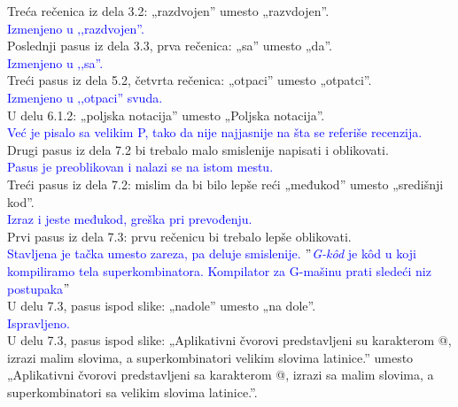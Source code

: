 \documentclass[a4paper]{report}
\newcommand{\odgovor}[1]{\textcolor{blue}{#1}}
\begin{document}
Treća rečenica iz dela 3.2: „razdvojen” umesto „razvdojen”.\\

\odgovor{Izmenjeno u ‚‚razdvojen''.}\\

Poslednji pasus iz dela 3.3, prva rečenica: „sa” umesto „da”.\\

\odgovor{Izmenjeno u ‚‚sa''.}\\

Treći pasus iz dela 5.2, četvrta rečenica: „otpaci” umesto „otpatci”.\\

\odgovor{Izmenjeno u ‚‚otpaci'' svuda.}\\

U delu 6.1.2: „poljska notacija” umesto „Poljska notacija”.\\

\odgovor{Već je pisalo sa velikim P, tako da nije najjasnije na šta se referiše recenzija.}\\

Drugi pasus iz dela 7.2 bi trebalo malo smislenije napisati i oblikovati.\\

\odgovor{Pasus je preoblikovan i nalazi se na istom mestu.}\\

Treći pasus iz dela 7.2: mislim da bi bilo lepše reći „međukod” umesto „središnji kod”.\\

\odgovor{Izraz i jeste međukod, greška pri prevođenju.}\\

Prvi pasus iz dela 7.3: prvu rečenicu bi trebalo lepše oblikovati.\\

\odgovor{Stavljena je tačka umesto zareza, pa deluje smislenije. $"${\em G-k\^ od} je k\^ od u koji kompiliramo tela superkombinatora. Kompilator za G-mašinu prati sledeći niz postupaka$"$}\\

U delu 7.3, pasus ispod slike: „nadole” umesto „na dole”.\\

\odgovor{Ispravljeno.}\\

U delu 7.3, pasus ispod slike: „Aplikativni čvorovi predstavljeni su karakterom @, izrazi malim slovima, a superkombinatori velikim slovima latinice.” umesto „Aplikativni čvorovi predstavljeni sa karakterom @, izrazi sa malim slovima, a superkombinatori sa velikim slovima latinice.”.\\
\end{document}
